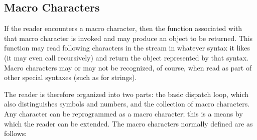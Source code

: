 \subsection{Macro Characters}
\label{MACRO-CHARACTERS-SECTION}
If the reader encounters a macro
character, then the function associated with that macro character is
invoked and may produce an object to be returned.  This function may read
following characters in the stream in whatever syntax it likes (it may
even call  recursively) and return the object represented by
that syntax.  Macro characters may or may not be recognized, of course,
when read as part of other special syntaxes (such as for strings).

The reader is therefore organized into two parts: the basic dispatch loop,
which also distinguishes symbols and numbers, and the collection
of macro characters.  Any character can be reprogrammed as a macro character;
this is a means by which the reader can be extended.
The macro characters normally defined are as follows:
